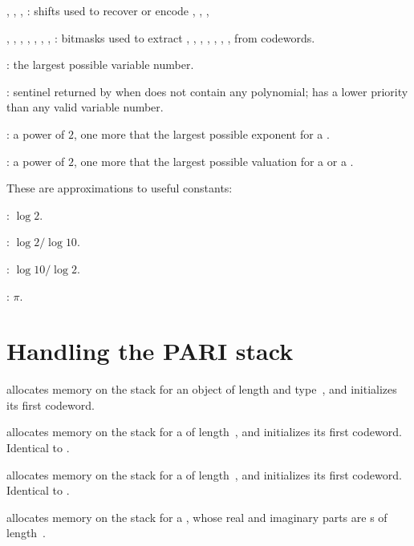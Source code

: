 \noindent {},
,
,
: shifts used to recover or encode , ,
, 

\noindent {},
,
,
,
,
,
,
: bitmasks used to extract , , ,
, , , ,  from 
codewords.

\noindent {}: the largest possible variable number.

\noindent {}:  sentinel returned by  when 
does not contain any polynomial; has a lower priority than any valid variable
number.

\noindent {}: a power of $2$, one more that the largest possible
exponent for a .

\noindent {}: a power of $2$, one more that the largest possible
valuation for a  or a .


These are  approximations to useful constants:

\noindent {}: $\log 2$.

\noindent {}: $\log 2 / \log 10$.

\noindent {}: $\log 10 / \log 2$.

\noindent {}: $\pi$.

\section{Handling the PARI stack}


 allocates memory on the stack for
an object of length  and type~, and initializes its first
codeword.

 allocates memory on the stack for a 
of length~, and initializes its first codeword. Identical to
.

 allocates memory on the stack for a 
of length~, and initializes its first codeword. Identical to
.

 allocates memory on the stack for a
, whose real and imaginary parts are s
of length~.

